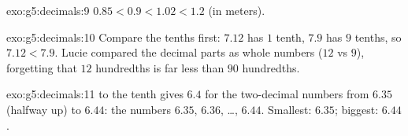 \begin{solution}{exo:g5:decimals:9}
$0.85 < 0.9 < 1.02 < 1.2$ (in meters).
\end{solution}

\begin{solution}{exo:g5:decimals:10}
Compare the tenths first: $7.12$ has $1$ tenth, $7.9$ has $9$
tenths, so $7.12 < 7.9$. Lucie compared the decimal parts as whole
numbers ($12$ vs $9$), forgetting that $12$ hundredths is far less
than $90$ hundredths.
\end{solution}

\begin{solution}{exo:g5:decimals:11}
 to the tenth gives $6.4$ for the two-decimal numbers from
$6.35$ (halfway  up) to $6.44$: the numbers $6.35$, $6.36$,
\dots, $6.44$. Smallest: $6.35$; biggest: $6.44$.
\end{solution}
